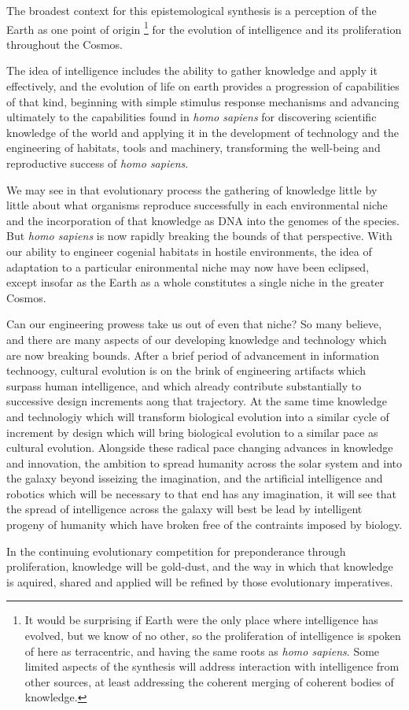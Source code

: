 
The broadest context for this epistemological synthesis is a perception of the Earth as one point of origin%
\footnote{It would be surprising if Earth were the only place where intelligence has evolved, but we know of no other, so the proliferation of intelligence is spoken of here as terracentric, and having the same roots as \emph{homo sapiens}.
Some limited aspects of the synthesis will address interaction with intelligence from other sources, at least addressing the coherent merging of coherent bodies of knowledge.} %
 for the evolution of intelligence and its proliferation throughout the Cosmos.

The idea of intelligence includes the ability to gather knowledge and apply it effectively, and the evolution of life on earth provides a progression of capabilities of that kind, beginning with simple stimulus response mechanisms and advancing ultimately to the capabilities found in \emph{homo sapiens} for discovering scientific knowledge of the world and applying it in the development of technology and the engineering of habitats, tools and machinery, transforming the well-being and reproductive success of \emph{homo sapiens}.

We may see in that evolutionary process the gathering of knowledge little by little about what organisms reproduce successfully in each environmental niche and the incorporation of that knowledge as DNA into the genomes of the species.
But \emph{homo sapiens} is now rapidly breaking the bounds of that perspective.
With our ability to engineer cogenial habitats in hostile environments, the idea of adaptation to a particular enironmental niche may now have been eclipsed, except insofar as the Earth as a whole constitutes a single niche in the greater Cosmos.

Can our engineering prowess take us out of even that niche?
So many believe, and there are many aspects of our developing knowledge and technology which are now breaking bounds.
After a brief period of advancement in information technoogy, cultural evolution is on the brink of engineering artifacts which surpass human intelligence, and which already contribute substantially to successive design increments aong that trajectory.
At the same time knowledge and technologiy which will transform biological evolution into a similar cycle of increment by design which will bring biological evolution to a similar pace as cultural evolution.
Alongside these radical pace changing advances in knowledge and innovation, the ambition to spread humanity across the solar system and into the galaxy beyond isseizing the imagination, and the artificial intelligence and robotics which will be necessary to that end has any imagination, it will see that the spread of intelligence across the galaxy will best be lead by intelligent progeny of humanity which have broken free of the contraints imposed by biology.

In the continuing evolutionary competition for preponderance through proliferation, knowledge will be gold-dust, and the way in which that knowledge is aquired, shared and applied will be refined by those evolutionary imperatives.


\cite{gordon1993}


